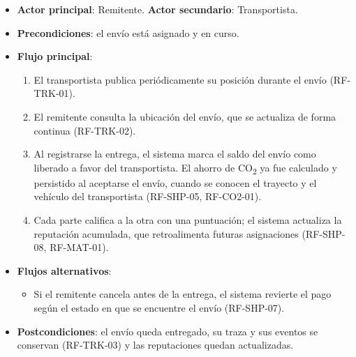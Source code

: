 {\begin{itemize}[leftmargin=2em]
    \item \textbf{Actor principal}: Remitente. \quad \textbf{Actor secundario}: Transportista.
    \item \textbf{Precondiciones}: el envío está asignado y en curso.
    \item \textbf{Flujo principal}:
    \begin{enumerate}[leftmargin=2em]
        \item El transportista publica periódicamente su posición durante el envío (RF-TRK-01).
        \item El remitente consulta la ubicación del envío, que se actualiza de forma continua (RF-TRK-02).
        \item Al registrarse la entrega, el sistema marca el saldo del envío como liberado a favor del transportista. El ahorro de CO\textsubscript{2} ya fue calculado y persistido al aceptarse el envío, cuando se conocen el trayecto y el vehículo del transportista (RF-SHP-05, RF-CO2-01).
        \item Cada parte califica a la otra con una puntuación; el sistema actualiza la reputación acumulada, que retroalimenta futuras asignaciones (RF-SHP-08, RF-MAT-01).
    \end{enumerate}
    \item \textbf{Flujos alternativos}:
    \begin{itemize}[leftmargin=2em]
        \item[3a.] Si el remitente cancela antes de la entrega, el sistema revierte el pago según el estado en que se encuentre el envío (RF-SHP-07).
    \end{itemize}
    \item \textbf{Postcondiciones}: el envío queda entregado, su traza y sus eventos se conservan (RF-TRK-03) y las reputaciones quedan actualizadas.
\end{itemize}
}%
